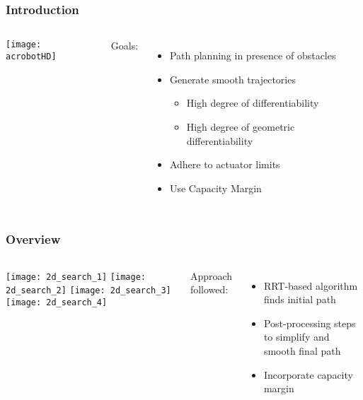 \begin{frame}
	\frametitle{Introduction}

	\begin{columns}
			\begin{center}
				\texttt{[image: acrobotHD]}
			\end{center}


			Goals:

			\begin{itemize}

				\item
					Path planning in presence of obstacles

				\item
					Generate smooth trajectories

					\begin{itemize}
						\item High degree of differentiability
						\item High degree of geometric differentiability
					\end{itemize}

				\item
					Adhere to actuator limits

				\item
					Use Capacity Margin

			\end{itemize}
	\end{columns}
\end{frame}

\begin{frame}
	\frametitle{Overview}

	\begin{columns}
		\column{0.65\textwidth}
			\begin{minipage}{\textwidth}
				\texttt{[image: 2d\_search\_1]}%
				\texttt{[image: 2d\_search\_2]}
				\texttt{[image: 2d\_search\_3]}%
				\texttt{[image: 2d\_search\_4]}
			\end{minipage}

		\column{0.35\textwidth}

			Approach followed:

			\begin{itemize}

				\item

					RRT-based algorithm finds initial path

				\item

					Post-processing steps to simplify and smooth final path

				\item

					Incorporate capacity margin

			\end{itemize}

	\end{columns}

\end{frame}

